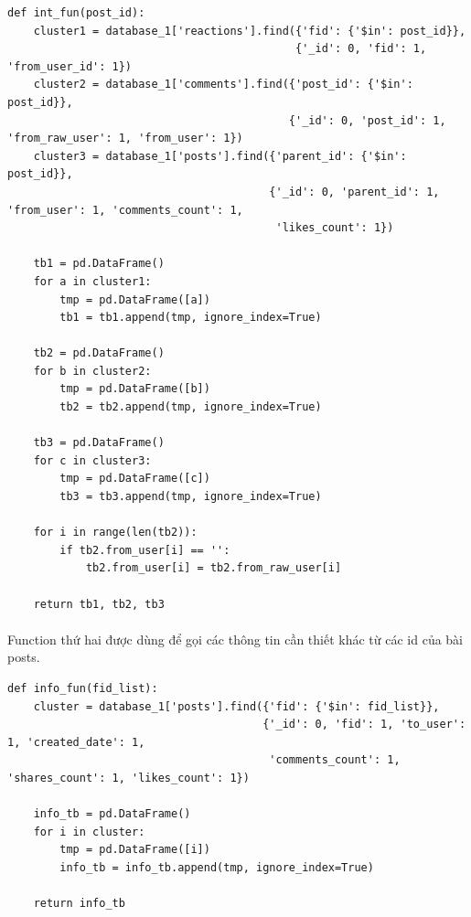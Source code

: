 \documentclass[12pt]{article}
\numberwithin{equation}{section}
\begin{document}
\begin{lstlisting}
def int_fun(post_id):
    cluster1 = database_1['reactions'].find({'fid': {'$in': post_id}},
                                            {'_id': 0, 'fid': 1, 'from_user_id': 1})
    cluster2 = database_1['comments'].find({'post_id': {'$in': post_id}},
                                           {'_id': 0, 'post_id': 1, 'from_raw_user': 1, 'from_user': 1})
    cluster3 = database_1['posts'].find({'parent_id': {'$in': post_id}},
                                        {'_id': 0, 'parent_id': 1, 'from_user': 1, 'comments_count': 1,
                                         'likes_count': 1})

    tb1 = pd.DataFrame()
    for a in cluster1:
        tmp = pd.DataFrame([a])
        tb1 = tb1.append(tmp, ignore_index=True)

    tb2 = pd.DataFrame()
    for b in cluster2:
        tmp = pd.DataFrame([b])
        tb2 = tb2.append(tmp, ignore_index=True)

    tb3 = pd.DataFrame()
    for c in cluster3:
        tmp = pd.DataFrame([c])
        tb3 = tb3.append(tmp, ignore_index=True)

    for i in range(len(tb2)):
        if tb2.from_user[i] == '':
            tb2.from_user[i] = tb2.from_raw_user[i]

    return tb1, tb2, tb3
\end{lstlisting}

\paragraph{} Function thứ hai được dùng để gọi các thông tin cần thiết khác từ các id của bài posts.
\\

\begin{lstlisting}
def info_fun(fid_list):
    cluster = database_1['posts'].find({'fid': {'$in': fid_list}},
                                       {'_id': 0, 'fid': 1, 'to_user': 1, 'created_date': 1,
                                        'comments_count': 1, 'shares_count': 1, 'likes_count': 1})

    info_tb = pd.DataFrame()
    for i in cluster:
        tmp = pd.DataFrame([i])
        info_tb = info_tb.append(tmp, ignore_index=True)

    return info_tb
\end{lstlisting}
\end{document}
